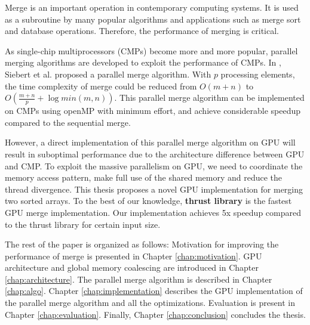 Merge is an important operation in contemporary computing systems. It is used as a subroutine
by many popular algorithms and applications such as merge sort 
and database operations. Therefore, the performance of merging is critical. 

As single-chip multiprocessors (CMPs) become more and more popular, parallel merging algorithms are 
developed to exploit the performance of CMPs. 
In \cite{pmalgo}, Siebert et al. proposed a parallel merge algorithm. 
With $p$ processing elements, 
the time complexity of merge could be reduced from $O(m+n)$ to $O(\frac{m+n}{p} + \log min(m,n))$.
This parallel merge algorithm can be implemented on CMPs using openMP with minimum effort, 
and achieve considerable speedup compared to
the sequential merge. 

However, a direct implementation of this parallel merge algorithm on GPU will result in 
suboptimal performance due to the architecture difference between GPU and CMP. To exploit the massive parallelism on GPU, we need to 
coordinate the memory access pattern, make full use of the shared memory and reduce the thread
divergence. This thesis proposes a novel GPU implementation for merging two sorted arrays. To the 
best of our knowledge, \textbf{thrust library} is the fastest GPU merge implementation. Our 
implementation achieves 5x speedup compared to the thrust library for certain input size.

The rest of the paper is organized as follows: 
Motivation for improving the performance of merge is presented in Chapter \ref{chap:motivation}.
GPU architecture and global memory coalescing are introduced in Chapter \ref{chap:architecture}.  
The parallel merge algorithm \cite{pmalgo} is described in Chapter \ref{chap:algo}. 
Chapter \ref{chap:implementation} describes the GPU implementation of the parallel merge algorithm
and all the optimizations. 
Evaluation is present in Chapter \ref{chap:evaluation}. 
Finally, Chapter \ref{chap:conclusion} concludes the thesis.
